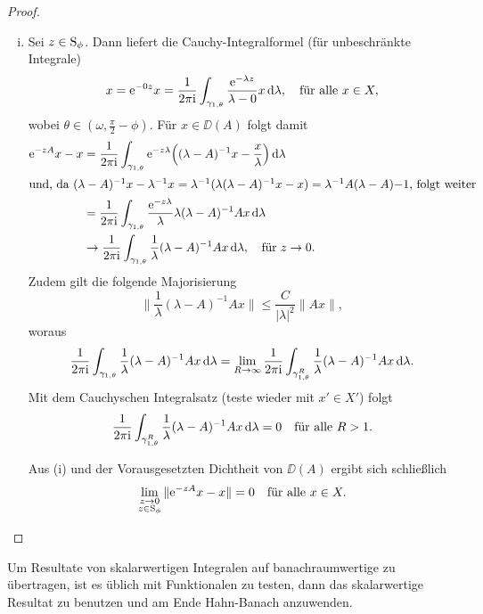 \begin{proof}
\begin{enumerate}[(i)]
    \item Sei $z \in \mathrm{S}_\phi$. 
      Dann liefert die Cauchy-Integralformel (für unbeschränkte Integrale)
      $$
      x 
      = \mathrm{e}^{-0z} x
      = \frac{1}{2\pi \mathrm{i}} \int_{\gamma_{1,\theta}} \frac{\mathrm{e}^{-\lambda z}}{\lambda - 0} x \, {\operatorname{d}\!{\lambda}}, \quad\text{für alle } x \in X,
      $$
      wobei $\theta \in (\omega, \frac{\pi}{2} - \phi)$.
      Für $x \in \DD(A)$ folgt damit
     \begin{align*}
       \mathrm{e}^{-zA} x - x 
       &= \frac{1}{2\pi \mathrm{i}} \int_{\gamma_{1,\theta}} \mathrm{e}^{-z\lambda} \Big( (\lambda - A)^{-1} x - \frac{x}{\lambda} \Big) \, {\operatorname{d}\!{\lambda}}\\
       \intertext{und, da $(\lambda - A)^{-1} x - \lambda^{-1} x = \lambda^{-1}(\lambda(\lambda - A)^{-1}x - x) = \lambda^{-1} A (\lambda - A){-1}$, folgt weiter}
       &= \frac{1}{2\pi \mathrm{i}} \int_{\gamma_{1,\theta}} \frac{\mathrm{e}^{-z\lambda}}{\lambda}  \lambda (\lambda - A)^{-1} A x \, {\operatorname{d}\!{\lambda}} \\
       &\to \frac{1}{2\pi \mathrm{i}} \int_{\gamma_{1,\theta}} \frac{1}{\lambda} (\lambda - A)^{-1} A x \, {\operatorname{d}\!{\lambda}}, \quad \text{für } z \to 0.
     \end{align*}
     Zudem gilt die folgende Majorisierung
     $$
     \| \frac{1}{\lambda} (\lambda - A)^{-1} A x \| \leq \frac{C}{|\lambda|^2} \|A x \|,
     $$
     woraus 
     $$
     \frac{1}{2\pi \mathrm{i}} \int_{\gamma_{1,\theta}} \frac{1}{\lambda} (\lambda - A)^{-1} A x \, {\operatorname{d}\!{\lambda}} = \lim_{R \to \infty} \frac{1}{2\pi \mathrm{i}} \int_{\gamma_{1,\theta}^R} \frac{1}{\lambda} (\lambda - A)^{-1} A x \, {\operatorname{d}\!{\lambda}}.
     $$
     Mit dem Cauchyschen Integralsatz (teste wieder mit $x' \in X'$) folgt
     $$
     \frac{1}{2\pi \mathrm{i}} \int_{\gamma_{1,\theta}^R} \frac{1}{\lambda} (\lambda - A)^{-1} A x \, {\operatorname{d}\!{\lambda}} = 0 \quad\text{für alle }R > 1.
     $$

     Aus (i) und der Vorausgesetzten Dichtheit von $\DD(A)$ ergibt sich schließlich
     \[
     \lim_{\substack{z \to 0\\ z \in \mathrm{S}_\phi}} \|\mathrm{e}^{-zA} x - x \| = 0 \quad\text{für alle } x \in X. \qedhere
     \]
  \end{enumerate}
\end{proof}

\begin{rem}
  Um Resultate von skalarwertigen Integralen auf banachraumwertige zu übertragen, ist es üblich mit Funktionalen zu testen, dann das skalarwertige Resultat zu benutzen und am Ende Hahn-Banach anzuwenden.
\end{rem}

